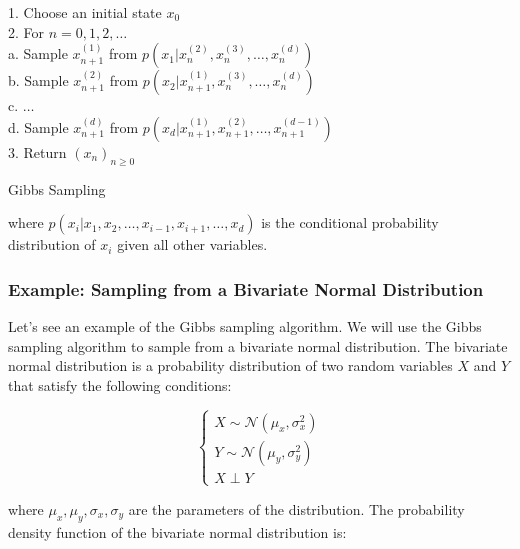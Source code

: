 \documentclass{report}
\begin{document}
\begin{center}
	\begin{minipage}{0.7\linewidth} %
		\begin{algorithm}[H]
			1. Choose an initial state $x_0$ \\
			2. For $n = 0, 1, 2, \dots$ \\
			\hspace*{0.5cm} a. Sample $x_{n+1}^{(1)}$ from $p(x_1 | x_n^{(2)}, x_n^{(3)}, \dots, x_n^{(d)})$ \\
			\hspace*{0.5cm} b. Sample $x_{n+1}^{(2)}$ from $p(x_2 | x_{n+1}^{(1)}, x_n^{(3)}, \dots, x_n^{(d)})$ \\
			\hspace*{0.5cm} c. $\dots$ \\
			\hspace*{0.5cm} d. Sample $x_{n+1}^{(d)}$ from $p(x_d | x_{n+1}^{(1)}, x_{n+1}^{(2)}, \dots, x_{n+1}^{(d-1)})$ \\
			3. Return $(x_n)_{n \geq 0}$
			\caption{Gibbs Sampling} %
			\label{alg:Gibbs-Sampling}   %
		\end{algorithm}
	\end{minipage}
\end{center}

where $p(x_i | x_1, x_2, \dots, x_{i-1}, x_{i+1}, \dots, x_d)$ is the conditional probability distribution of $x_i$ given all other variables. 

\subsubsection{Example: Sampling from a Bivariate Normal Distribution}
\label{sec:bivariate_normal_sampling}

Let's see an example of the Gibbs sampling algorithm. We will use the Gibbs sampling algorithm to sample from a bivariate normal distribution. The bivariate normal distribution is a probability distribution of two random variables $X$ and $Y$ that satisfy the following conditions:

\[
	\begin{cases}
		X \sim \mathcal{N}(\mu_x, \sigma_x^2) \\
		Y \sim \mathcal{N}(\mu_y, \sigma_y^2) \\
		X \perp Y
	\end{cases}
\]

where $\mu_x, \mu_y, \sigma_x, \sigma_y$ are the parameters of the distribution. The probability density function of the bivariate normal distribution is:
\end{document}
